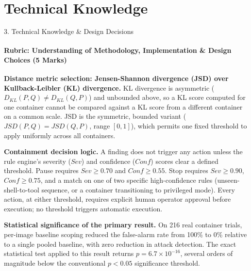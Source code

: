 \documentclass[aspectratio=169, 11pt]{beamer}
\begin{document}
\section{Technical Knowledge}
\begin{frame}{3. Technical Knowledge \& Design Decisions}
    \framesubtitle{Rubric: Understanding of Methodology, Implementation \& Design Choices (5 Marks)}
    \footnotesize

    \textbf{Distance metric selection: Jensen-Shannon divergence (JSD) over
    Kullback-Leibler (KL) divergence.} KL divergence is asymmetric
    ($D_{KL}(P,Q)\neq D_{KL}(Q,P)$) and unbounded above, so a KL score
    computed for one container cannot be compared against a KL score from a
    different container on a common scale. JSD is the symmetric, bounded
    variant ($JSD(P,Q)=JSD(Q,P)$, range $[0,1]$), which permits one fixed
    threshold to apply uniformly across all containers.

    \medskip
    \textbf{Containment decision logic.} A finding does not trigger any
    action unless the rule engine's severity ($Sev$) and confidence
    ($Conf$) scores clear a defined threshold. Pause requires
    $Sev\geq0.70$ and $Conf\geq0.55$. Stop requires $Sev\geq0.90$,
    $Conf\geq0.75$, and a match on one of two specific high-confidence
    rules (unseen-shell-to-tool sequence, or a container transitioning to
    privileged mode). Every action, at either threshold, requires explicit
    human operator approval before execution; no threshold triggers
    automatic execution.

    \medskip
    \textbf{Statistical significance of the primary result.} On 216 real
    container trials, per-image baseline scoping reduced the false-alarm
    rate from 100\% to 0\% relative to a single pooled baseline, with zero
    reduction in attack detection. The exact statistical test applied to
    this result returns $p=6.7\times10^{-16}$, several orders of magnitude
    below the conventional $p<0.05$ significance threshold.
\end{frame}
\end{document}
